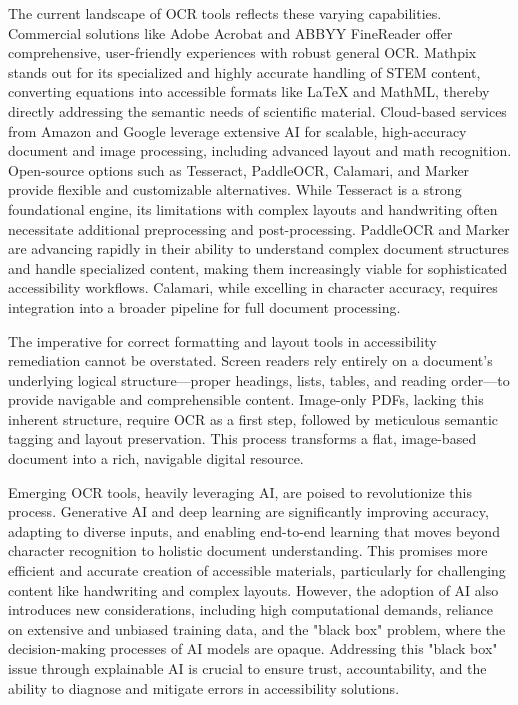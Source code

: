 The current landscape of OCR tools reflects these varying capabilities. Commercial solutions like Adobe Acrobat and ABBYY FineReader offer comprehensive, user-friendly experiences with robust general OCR. Mathpix stands out for its specialized and highly accurate handling of STEM content, converting equations into accessible formats like LaTeX and MathML, thereby directly addressing the semantic needs of scientific material. Cloud-based services from Amazon and Google leverage extensive AI for scalable, high-accuracy document and image processing, including advanced layout and math recognition. Open-source options such as Tesseract, PaddleOCR, Calamari, and Marker provide flexible and customizable alternatives. While Tesseract is a strong foundational engine, its limitations with complex layouts and handwriting often necessitate additional preprocessing and post-processing. PaddleOCR and Marker are advancing rapidly in their ability to understand complex document structures and handle specialized content, making them increasingly viable for sophisticated accessibility workflows. Calamari, while excelling in character accuracy, requires integration into a broader pipeline for full document processing.

The imperative for correct formatting and layout tools in accessibility remediation cannot be overstated. Screen readers rely entirely on a document's underlying logical structure—proper headings, lists, tables, and reading order—to provide navigable and comprehensible content. Image-only PDFs, lacking this inherent structure, require OCR as a first step, followed by meticulous semantic tagging and layout preservation. This process transforms a flat, image-based document into a rich, navigable digital resource.

Emerging OCR tools, heavily leveraging AI, are poised to revolutionize this process. Generative AI and deep learning are significantly improving accuracy, adapting to diverse inputs, and enabling end-to-end learning that moves beyond character recognition to holistic document understanding. This promises more efficient and accurate creation of accessible materials, particularly for challenging content like handwriting and complex layouts. However, the adoption of AI also introduces new considerations, including high computational demands, reliance on extensive and unbiased training data, and the "black box" problem, where the decision-making processes of AI models are opaque. Addressing this "black box" issue through explainable AI is crucial to ensure trust, accountability, and the ability to diagnose and mitigate errors in accessibility solutions.

